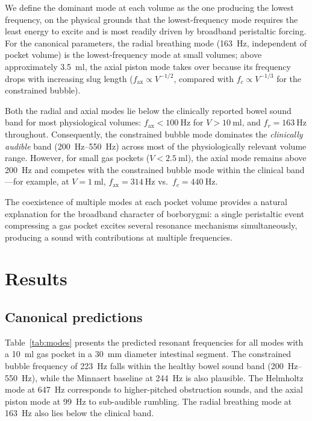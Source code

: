 \documentclass[12pt]{article}
\begin{document}
We define the dominant mode at each volume as the one producing the lowest
frequency, on the physical grounds that the lowest-frequency mode requires
the least energy to excite and is most readily driven by broadband peristaltic
forcing.  For the canonical parameters, the radial breathing mode
(\SI{163}{\hertz}, independent of pocket volume) is the lowest-frequency mode
at small volumes; above approximately \SI{3.5}{\milli\litre}, the axial
piston mode takes over because its frequency drops with increasing slug
length ($f_\mathrm{ax} \propto V^{-1/2}$, compared with
$f_c \propto V^{-1/3}$ for the constrained bubble).

Both the radial and axial modes lie below the clinically reported bowel sound
band for most physiological volumes: $f_\mathrm{ax} < \SI{100}{\hertz}$ for
$V > \SI{10}{\milli\litre}$, and $f_r = \SI{163}{\hertz}$ throughout.
Consequently, the constrained bubble mode dominates the \emph{clinically
audible} band (\SIrange{200}{550}{\hertz}) across most of the
physiologically relevant volume range.  However, for small gas pockets
($V < \SI{2.5}{\milli\litre}$), the axial mode remains above
\SI{200}{\hertz} and competes with the constrained bubble mode within the
clinical band---for example, at $V = \SI{1}{\milli\litre}$,
$f_\mathrm{ax} = \SI{314}{\hertz}$ vs.\ $f_c = \SI{440}{\hertz}$.

The coexistence of multiple modes at each pocket volume provides a natural
explanation for the broadband character of borborygmi: a single peristaltic
event compressing a gas pocket excites several resonance mechanisms
simultaneously, producing a sound with contributions at multiple frequencies.

\section{Results}
\label{sec:results}

\subsection{Canonical predictions}
\label{sec:canonical}

Table~\ref{tab:modes} presents the predicted resonant frequencies for all
modes with a \SI{10}{\milli\litre} gas pocket in a
\SI{30}{\milli\metre} diameter intestinal segment.  The constrained bubble
frequency of \SI{223}{\hertz} falls within the healthy bowel sound band
(\SIrange{200}{550}{\hertz}), while the Minnaert baseline at
\SI{244}{\hertz} is also plausible.  The Helmholtz mode at
\SI{647}{\hertz} corresponds to higher-pitched obstruction sounds, and the
axial piston mode at \SI{99}{\hertz} to sub-audible rumbling.  The radial
breathing mode at \SI{163}{\hertz} also lies below the clinical band.
\end{document}
